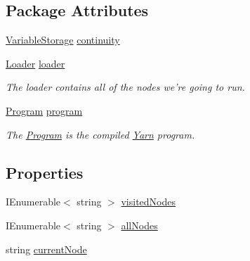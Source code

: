 \subsection*{Package Attributes}
\begin{DoxyCompactItemize}
\item 
\hyperlink{a00169}{Variable\-Storage} \hyperlink{a00090_ae94eaa4b03b432422f5d205fabe37ff5}{continuity}
\item 
\hyperlink{a00127}{Loader} \hyperlink{a00090_a98bbe0ac2ccadeeeb7e05e3e6e19f2e0}{loader}
\begin{DoxyCompactList}\small\item\em The loader contains all of the nodes we're going to run. \end{DoxyCompactList}\item 
\hyperlink{a00140}{Program} \hyperlink{a00090_a0a1cca92325f430425d784d416cb5c2b}{program}
\begin{DoxyCompactList}\small\item\em The \hyperlink{a00140}{Program} is the compiled \hyperlink{a00050}{Yarn} program. \end{DoxyCompactList}\end{DoxyCompactItemize}
\subsection*{Properties}
\begin{DoxyCompactItemize}
\item 
I\-Enumerable$<$ string $>$ \hyperlink{a00090_ac5661051e0b7f44527fe526c7766dbbf}{visited\-Nodes}
\item 
I\-Enumerable$<$ string $>$ \hyperlink{a00090_a0ee573e3d072bccf98ba1d975612d42c}{all\-Nodes}
\item 
string \hyperlink{a00090_af368b5c342d585dc6953876c5965ccc8}{current\-Node}
\end{DoxyCompactItemize}
